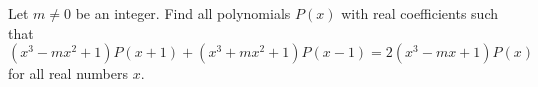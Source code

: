 Let $m \neq 0$ be an integer. Find all polynomials $P(x)$ with real coefficients such that
\[
(x^3 - mx^2 + 1)P(x+1) + (x^3 + mx^2 + 1)P(x-1) = 2(x^3 - mx + 1)P(x)
\]
for all real numbers $x$.
